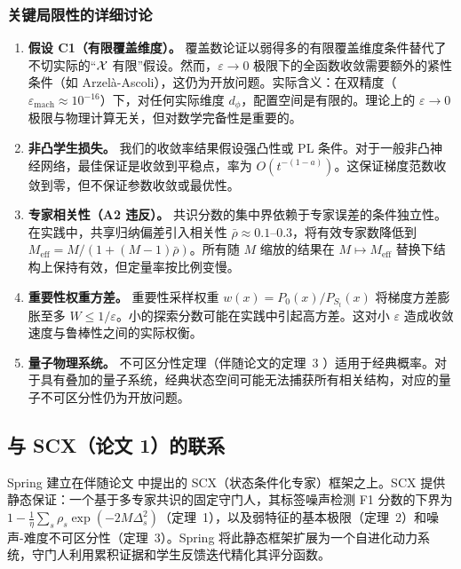 \subsubsection{关键局限性的详细讨论}

\begin{enumerate}[nosep]
    \item \textbf{假设 C1（有限覆盖维度）。} 覆盖数论证以弱得多的有限覆盖维度条件替代了不切实际的``$\mathcal{X}$ 有限''假设。然而，$\varepsilon \to 0$ 极限下的全函数收敛需要额外的紧性条件（如 Arzel\`{a}-Ascoli），这仍为开放问题。实际含义：在双精度（$\varepsilon_{\text{mach}} \approx 10^{-16}$）下，对任何实际维度 $d_\phi$，配置空间是有限的。理论上的 $\varepsilon \to 0$ 极限与物理计算无关，但对数学完备性是重要的。

    \item \textbf{非凸学生损失。} 我们的收敛率结果假设强凸性或 PL 条件。对于一般非凸神经网络，最佳保证是收敛到平稳点，率为 $O(t^{-(1-a)})$。这保证梯度范数收敛到零，但不保证参数收敛或最优性。

    \item \textbf{专家相关性（A2 违反）。} 共识分数的集中界依赖于专家误差的条件独立性。在实践中，共享归纳偏差引入相关性 $\bar{\rho} \approx 0.1$--$0.3$，将有效专家数降低到 $M_{\text{eff}} = M/(1 + (M-1)\bar{\rho})$。所有随 $M$ 缩放的结果在 $M \mapsto M_{\text{eff}}$ 替换下结构上保持有效，但定量率按比例变慢。

    \item \textbf{重要性权重方差。} 重要性采样权重 $w(x) = P_0(x)/P_{S_t}(x)$ 将梯度方差膨胀至多 $W \leq 1/\varepsilon$。小的探索分数可能在实践中引起高方差。这对小 $\varepsilon$ 造成收敛速度与鲁棒性之间的实际权衡。

    \item \textbf{量子物理系统。} 不可区分性定理（伴随论文的定理~3 \citep{scx2026}）适用于经典概率。对于具有叠加的量子系统，经典状态空间可能无法捕获所有相关结构，对应的量子不可区分性仍为开放问题。
\end{enumerate}

\subsection{与 SCX（论文 1）的联系}

Spring 建立在伴随论文 \citep{scx2026} 中提出的 SCX（状态条件化专家）框架之上。SCX 提供静态保证：一个基于多专家共识的固定守门人，其标签噪声检测 F1 分数的下界为 $1 - \frac{1}{\eta}\sum_s \rho_s \exp(-2M\Delta_s^2)$（定理~1），以及弱特征的基本极限（定理~2）和噪声-难度不可区分性（定理~3）。Spring 将此静态框架扩展为一个自进化动力系统，守门人利用累积证据和学生反馈迭代精化其评分函数。

